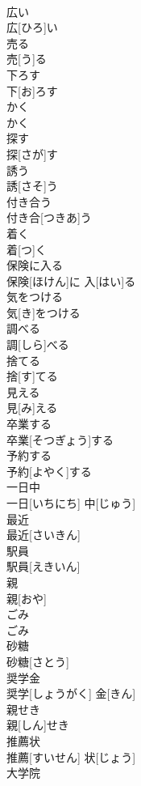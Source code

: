 \documentclass[8pt]{extreport}
\begin{document}
\begin{CJK}{UTF8}{min}
\\	広い	
\\	広[ひろ]い
\\	売る	
\\	売[う]る
\\	下ろす	
\\	下[お]ろす
\\	かく	
\\	かく
\\	探す	
\\	探[さが]す
\\	誘う	
\\	誘[さそ]う
\\	付き合う	
\\	付き合[つきあ]う
\\	着く	
\\	着[つ]く
\\	保険に入る	
\\	保険[ほけん]に 入[はい]る
\\	気をつける	
\\	気[き]をつける
\\	調べる	
\\	調[しら]べる
\\	捨てる	
\\	捨[す]てる
\\	見える	
\\	見[み]える
\\	卒業する	
\\	卒業[そつぎょう]する
\\	予約する	
\\	予約[よやく]する
\\	一日中	
\\	一日[いちにち] 中[じゅう]
\\	最近	
\\	最近[さいきん]
\\	駅員	
\\	駅員[えきいん]
\\	親	
\\	親[おや]
\\	ごみ	
\\	ごみ
\\	砂糖	
\\	砂糖[さとう]
\\	奨学金	
\\	奨学[しょうがく] 金[きん]
\\	親せき	
\\	親[しん]せき
\\	推薦状	
\\	推薦[すいせん] 状[じょう]
\\	大学院	

\end{CJK}
\end{document}
